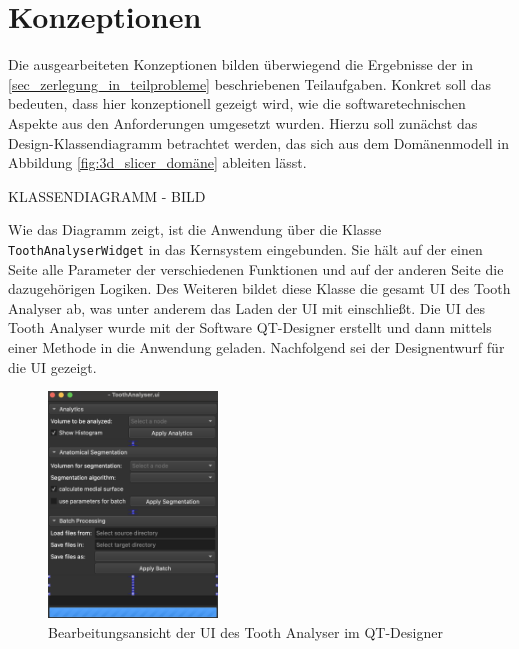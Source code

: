 \section{Konzeptionen}
\label{sec:konzeptionen} Die ausgearbeiteten Konzeptionen bilden überwiegend die
Ergebnisse der in \ref{sec_zerlegung_in_teilprobleme} beschriebenen Teilaufgaben.
Konkret soll das bedeuten, dass hier konzeptionell gezeigt wird, wie die
softwaretechnischen Aspekte aus den Anforderungen umgesetzt wurden. Hierzu soll zunächst
das Design-Klassendiagramm betrachtet werden, das sich aus dem Domänenmodell in
Abbildung \ref{fig:3d_slicer_domäne} ableiten lässt.

KLASSENDIAGRAMM - BILD

Wie das Diagramm zeigt, ist die Anwendung über die Klasse \texttt{ToothAnalyserWidget}
in das Kernsystem eingebunden. Sie hält auf der einen Seite alle Parameter der
verschiedenen Funktionen und auf der anderen Seite die dazugehörigen Logiken. Des
Weiteren bildet diese Klasse die gesamt UI des Tooth Analyser ab, was unter
anderem das Laden der \ac{UI} mit einschließt. Die UI des Tooth Analyser wurde
mit der Software QT-Designer erstellt und dann mittels einer Methode in die
Anwendung geladen. Nachfolgend sei der Designentwurf für die \ac{UI} gezeigt.

\begin{figure}[h]
	\centering
	\includegraphics[width=0.4\textwidth]{img/toothAnalyserQT.png}
	\caption{Bearbeitungsansicht der \ac{UI} des Tooth Analyser im QT-Designer}
	\label{fig:tooth_analyser_qt}
\end{figure}

